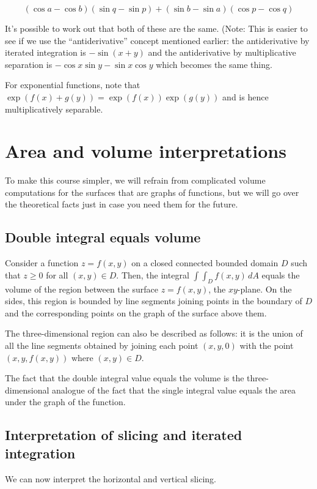 \documentclass[10pt]{amsart}
\begin{document}
$$(\cos a - \cos b)(\sin q - \sin p) + (\sin b - \sin a)(\cos p - \cos q)$$

It's possible to work out that both of these are the same. (Note: This
is easier to see if we use the ``antiderivative'' concept mentioned
earlier: the antiderivative by iterated integration is $-\sin(x + y)$
and the antiderivative by multiplicative separation is $-\cos x \sin y
- \sin x \cos y$ which becomes the same thing.

For exponential functions, note that $\exp(f(x) + g(y)) =
\exp(f(x))\exp(g(y))$ and is hence multiplicatively separable.


\section{Area and volume interpretations}

To make this course simpler, we will refrain from complicated volume
computations for the surfaces that are graphs of functions, but we
will go over the theoretical facts just in case you need them for the
future.

\subsection{Double integral equals volume}

Consider a function $z = f(x,y)$ on a closed connected bounded domain
$D$ such that $z \ge 0$ for all $(x,y) \in D$. Then, the integral
$\int \int_D f(x,y) \, dA$ equals the volume of the region between the
surface $z = f(x,y)$, the $xy$-plane. On the sides, this region is
bounded by line segments joining points in the boundary of $D$ and the
corresponding points on the graph of the surface above them.

The three-dimensional region can also be described as follows: it is
the union of all the line segments obtained by joining each point
$(x,y,0)$ with the point $(x,y,f(x,y))$ where $(x,y) \in D$. 

The fact that the double integral value equals the volume is the
three-dimensional analogue of the fact that the single integral value
equals the area under the graph of the function.

\subsection{Interpretation of slicing and iterated integration}

We can now interpret the horizontal and vertical slicing.
\end{document}
